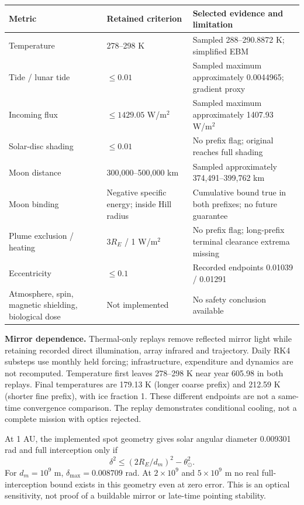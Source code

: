 ﻿\documentclass[10pt,a4paper]{article}
\begin{document}
\par\smallskip
{\small\noindent\begin{tabularx}{\linewidth}{@{}L{34mm}L{28mm}X@{}}\toprule
Metric & Retained criterion & Selected evidence and limitation\\\midrule
Temperature & 278--298 K & Sampled 288--290.8872 K; simplified EBM\\
Tide / lunar tide & $\le0.01$ & Sampled maximum approximately 0.0044965; gradient proxy\\
Incoming flux & $\le1429.05$ W/m$^2$ & Sampled maximum approximately 1407.93 W/m$^2$\\
Solar-disc shading & $\le0.01$ & No prefix flag; original reaches full shading\\
Moon distance & 300,000--500,000 km & Sampled approximately 374,491--399,762 km\\
Moon binding & Negative specific energy; inside Hill radius & Cumulative bound true in both prefixes; no future guarantee\\
Plume exclusion / heating & $3R_E$ / 1 W/m$^2$ & No prefix flag; long-prefix terminal clearance extrema missing\\
Eccentricity & $\le0.1$ & Recorded endpoints 0.01039 / 0.01291\\
Atmosphere, spin, magnetic shielding, biological dose & Not implemented & No safety conclusion available\\\bottomrule
\end{tabularx}\par}
\smallskip


\textbf{Mirror dependence.} Thermal-only replays remove reflected mirror light while retaining recorded direct illumination, array infrared and trajectory. Daily RK4 substeps use monthly held forcing; infrastructure, expenditure and dynamics are not recomputed. Temperature first leaves 278--298 K near year 605.98 in both replays. Final temperatures are 179.13 K (longer coarse prefix) and 212.59 K (shorter fine prefix), with ice fraction 1. These different endpoints are not a same-time convergence comparison. The replay demonstrates conditional cooling, not a complete mission with optics rejected.

At 1 AU, the implemented spot geometry gives solar angular diameter 0.009301 rad and full interception only if
\[
\delta^2\le(2R_E/d_m)^2-\theta_\odot^2.
\]
For $d_m=10^9$ m, $\delta_{\max}=0.008709$ rad. At $2\times10^9$ and $5\times10^9$ m no real full-interception bound exists in this geometry even at zero error. This is an optical sensitivity, not proof of a buildable mirror or late-time pointing stability.
\end{document}
